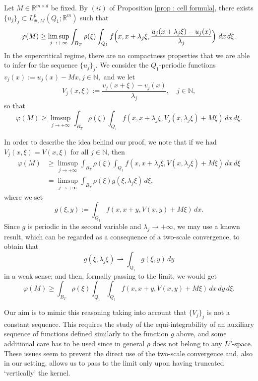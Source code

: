 \documentclass{article}
\theoremstyle{definition}
\newcommand{\f}{\varphi}
\newcommand{\N}{\mathbb{N}}
\newcommand{\R}{\mathbb{R}}
\begin{document}
Let $M\in \R^{m\times d}$ be fixed. By $(ii)$ of Proposition \ref{prop : cell formula}, there exists $\{u_j\}_j\subset L^p_{\#,M}(Q_1; \R^m)$ such that
\begin{equation*}
\f(M)\geq \limsup_{j\to+\infty} \int_{B_T} \rho(\xi)\int_{Q_1} f\Bigl(x,x+\lambda_j\xi,\frac{u_j(x+\lambda_j\xi)-u_j(x)}{\lambda_j}\Bigr)\ dx\,d\xi.
\end{equation*}
In the supercritical regime, there are no compactness properties that we are able to infer for the sequence $\{u_j\}_j$. We consider the $Q_1$-periodic functions $v_j(x):=u_j(x)-Mx, j\in\N,$ and we let
\begin{equation*}
    V_j(x,\xi):=\frac{v_j(x+\xi)-v_j(x)}{\lambda_j}, \quad j\in\N,
\end{equation*}
so that
\begin{equation}\label{superstarting}
\f(M)\geq \limsup_{j\to+\infty} \int_{B_T} \rho(\xi)\int_{Q_1} f(x,x+\lambda_j\xi,V_j(x,\lambda_j\xi)+M\xi)\, dx\,d\xi.
\end{equation}

In order to describe the idea behind our proof, we note that if we had $V_j(x,\xi)=V(x,\xi)$ for all $j\in\N$, then
\begin{align*}
\f(M) & \geq \limsup_{j\to+\infty} \int_{B_T} \rho(\xi)\int_{Q_1} f(x,x+\lambda_j\xi,V(x,\lambda_j\xi)+M\xi)\, dx\,d\xi \\
& = \limsup_{j\to+\infty} \int_{B_T} \rho(\xi)g(\xi,\lambda_j\xi)\,d\xi,
\end{align*}
where we set
\begin{equation*}
   g(\xi,y):= \int_{Q_1} f(x,x+y,V(x,y)+M\xi)\, dx.
\end{equation*}
Since $g$ is periodic in the second variable and $\lambda_j\to+\infty$, we may use a known result, which can be regarded as a consequence of a two-scale convergence, to obtain that
\begin{equation*}
    g(\xi, \lambda_j\xi)\rightharpoonup \int_{Q_1}g(\xi,y)\,dy
\end{equation*}
in a weak sense; and then, formally passing to the limit, we would get
\begin{equation*}
\f(M) \geq \int_{B_T}\rho(\xi)\int_{Q_1}\int_{Q_1} f(x,x+y,V(x,y)+M\xi)\, dx\,dy\,d\xi.
\end{equation*}

Our aim is to mimic this reasoning taking into account that $\{V_j\}_j$ is not a constant sequence. This requires the study of the equi-integrability of an auxiliary sequence of functions defined similarly to the function $g$ above, and some additional care has to be used since in general $\rho$ does not belong to any $L^p$-space. These issues seem to prevent the direct use of the two-scale convergence and, also in our setting, allows us to pass to the limit only upon having truncated `vertically' the kernel.
\end{document}
